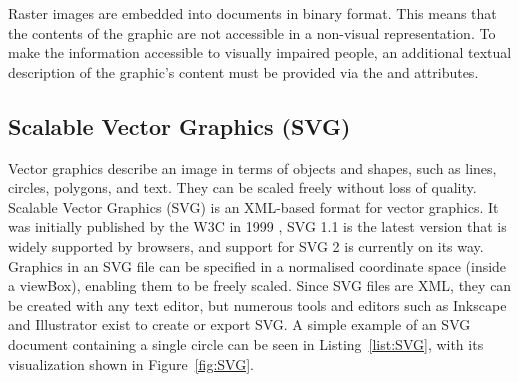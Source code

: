 Raster images are embedded into documents in binary format. This means
that the contents of the graphic are not accessible in a non-visual
representation. To make the information accessible to visually
impaired people, an additional textual description of the graphic's
content must be provided via the  and
 attributes.





\subsection{Scalable Vector Graphics (SVG)}
\label{sec:SVG}

Vector graphics describe an image in terms of objects and shapes, such
as lines, circles, polygons, and text. They can be scaled freely
without loss of quality. Scalable Vector Graphics (SVG) is an
XML-based format for vector graphics. It was initially published by
the W3C in 1999 \parencite{SVG1}, SVG 1.1 \parencite{SVG11} is the
latest version that is widely supported by browsers, and support for
SVG 2 \parencite{SVG2} is currently on its way. Graphics in an SVG
file can be specified in a normalised coordinate space (inside a
viewBox), enabling them to be freely scaled. Since SVG files are XML,
they can be created with any text editor, but numerous tools and
editors such as Inkscape \parencite{Inkscape} and Illustrator
\parencite{Illustrator} exist to create or export SVG. A simple example
of an SVG document containing a single circle can be seen in
Listing~\ref{list:SVG}, with its visualization shown in
Figure~\ref{fig:SVG}.

\begin{samepage}
%
A simple SVG document containing a  element.
The visual representation of this document in different sizes
is shown in Figure~\ref{fig:SVG}.
}
]{listings/circle.svg}
\end{samepage}


